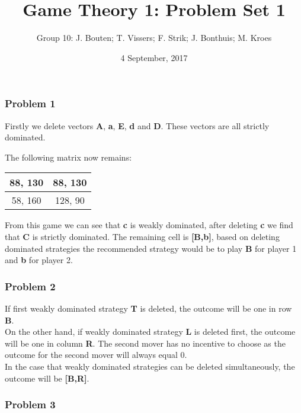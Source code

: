 \documentclass[]{article}
\author{Group 10: J. Bouten; T. Vissers; F. Strik; J. Bonthuis; M. Kroes}
\date{4 September, 2017}
\title{Game Theory 1: Problem Set 1}
\begin{document}
\maketitle



\subsubsection{Problem 1}\label{problem-1}

Firstly we delete vectors \textbf{A}, \textbf{a}, \textbf{E}, \textbf{d}
and \textbf{D}. These vectors are all strictly dominated.

The following matrix now remains:

\begin{tabular}{| c | c |}
  \hline			
  88, 130 &  88, 130 \\
\hline
  58, 160 & 128, 90 \\
  \hline  
\end{tabular}

From this game we can see that \textbf{c} is weakly dominated, after
deleting \textbf{c} we find that \textbf{C} is strictly dominated. The
remaining cell is \textbf{[B,b]}, based on deleting dominated
strategies the recommended strategy would be to play \textbf{B} for
player 1 and \textbf{b} for player 2.


\subsubsection{Problem 2}\label{problem-2}

If first weakly dominated strategy \textbf{T} is deleted, the outcome will be one in row \textbf{B}. \\

On the other hand, if weakly dominated strategy \textbf{L} is deleted first, the outcome will be one in column \textbf{R}.
The second mover has no incentive to choose as the outcome for the second mover will always equal 0. \\

In the case that weakly dominated strategies can be deleted simultaneously, the outcome will be \textbf{[B,R]}.
\subsubsection{Problem 3}\label{problem-3}
\end{document}
